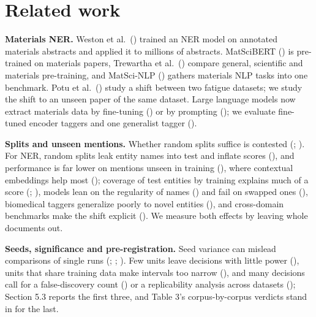 \documentclass[11pt,a4paper]{article}
\begin{document}
\hypertarget{related-work}{%
\section{Related work}\label{related-work}}

\textbf{Materials NER.} Weston et al.~(\citealp{weston2019named}) trained an NER model on
annotated materials abstracts and applied it to millions of abstracts.
MatSciBERT (\citealp{gupta2022matscibert}) is pre-trained on materials papers,
Trewartha et al.~(\citealp{trewartha2022quantifying}) compare general, scientific
and materials pre-training, and MatSci-NLP (\citealp{song2023matscinlp}) gathers
materials NLP tasks into one benchmark. Potu et al.~(\citealp{potu2025ontology})
study a shift between two fatigue datasets; we study the shift to an
unseen paper of the same dataset. Large language models now extract
materials data by fine-tuning (\citealp{dagdelen2024structured}) or by prompting
(\citealp{polak2024extracting}); we evaluate fine-tuned encoder taggers and one
generalist tagger (\citealp{zaratiana2024gliner}).

\textbf{Splits and unseen mentions.} Whether random splits suffice is contested
(\citealp{gorman2019standard}; \citealp{sogaard2021random}). For NER, random splits leak
entity names into test and inflate scores (\citealp{babl2025random}), and
performance is far lower on mentions unseen in training
(\citealp{augenstein2017generalisation}), where contextual embeddings help most
(\citealp{taille2020contextualized}); coverage of test entities by training explains
much of a score (\citealp{fu2020rethinking}; \citealp{lin2020rigorous}), models lean on the
regularity of names (\citealp{ghaddar2021context}) and fail on swapped ones
(\citealp{agarwal2020entityswitched}), biomedical taggers generalize poorly to novel
entities (\citealp{kim2022biomedical}), and cross-domain benchmarks make the shift
explicit (\citealp{liu2021crossner}). We measure both effects by leaving whole
documents out.

\textbf{Seeds, significance and pre-registration.} Seed variance can mislead
comparisons of single runs (\citealp{reimers2017reporting}; \citealp{dodge2020finetuning};
\citealp{bouthillier2021accounting}). Few units leave decisions with little power
(\citealp{card2020power}), units that share training data make intervals too narrow
(\citealp{nadeau2003inference}), and many decisions call for a false-discovery count
(\citealp{benjamini1995controlling}) or a replicability analysis across datasets
(\citealp{dror2017replicability}); Section 5.3 reports the first three, and Table
3's corpus-by-corpus verdicts stand in for the last.
\end{document}
